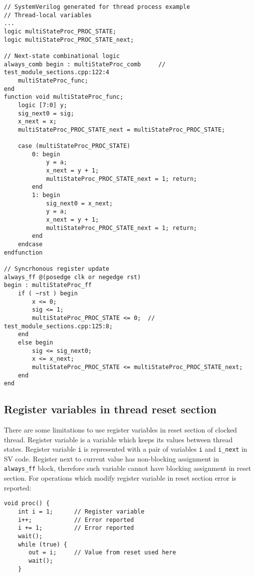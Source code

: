 \begin{lstlisting}[style=myverilog]
// SystemVerilog generated for thread process example
// Thread-local variables
...
logic multiStateProc_PROC_STATE;
logic multiStateProc_PROC_STATE_next;

// Next-state combinational logic
always_comb begin : multiStateProc_comb     // test_module_sections.cpp:122:4
    multiStateProc_func;
end
function void multiStateProc_func;
    logic [7:0] y;
    sig_next0 = sig;
    x_next = x;
    multiStateProc_PROC_STATE_next = multiStateProc_PROC_STATE;
    
    case (multiStateProc_PROC_STATE)
        0: begin
            y = a;
            x_next = y + 1;
            multiStateProc_PROC_STATE_next = 1; return;  
        end
        1: begin
            sig_next0 = x_next;
            y = a;
            x_next = y + 1;
            multiStateProc_PROC_STATE_next = 1; return; 
        end
    endcase
endfunction

// Syncrhonous register update
always_ff @(posedge clk or negedge rst) 
begin : multiStateProc_ff
    if ( ~rst ) begin
        x <= 0;
        sig <= 1;
        multiStateProc_PROC_STATE <= 0;  // test_module_sections.cpp:125:8;
    end
    else begin
        sig <= sig_next0;
        x <= x_next;
        multiStateProc_PROC_STATE <= multiStateProc_PROC_STATE_next;
    end
end
\end{lstlisting}

\subsection{Register variables in thread reset section}\label{section:reg_in_reset}

There are some limitations to use register variables in reset section of clocked thread. Register variable is a variable which keeps its values between thread states. Register variable {\tt i} is represented with a pair of variables {\tt i} and {\tt i\_next} in SV code. Register next to current value has non-blocking assignment in {\tt always\_ff} block, therefore such variable cannot have blocking assignment in reset section. For operations which modify register variable in reset section error is reported:
%
\begin{lstlisting}[style=mycpp]
void proc() {
    int i = 1;      // Register variable
    i++;            // Error reported
    i += 1;         // Error reported
    wait();
    while (true) {
       out = i;     // Value from reset used here
       wait();
    }        
\end{lstlisting}

